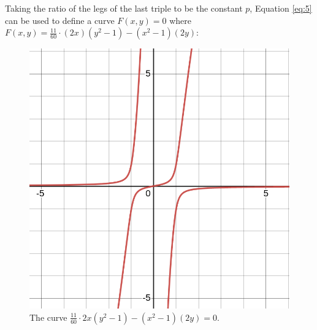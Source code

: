 \documentclass[11pt]{article}
\begin{document}
Taking the ratio of the legs of the last triple to be the constant $p$, Equation \eqref{eq:5} can be used to define a curve $F(x,y)=0$ where $F(x,y)=\frac{11}{60}\cdot(2x)(y^2-1)-(x^2-1)(2y)$:
\begin{figure}[h]
	\centering
	\includegraphics[scale=0.25]{4.png}
	\caption{The curve $\frac{11}{60}\cdot2x(y^2-1)-(x^2-1)(2y)=0$.}
\end{figure}
\end{document}
